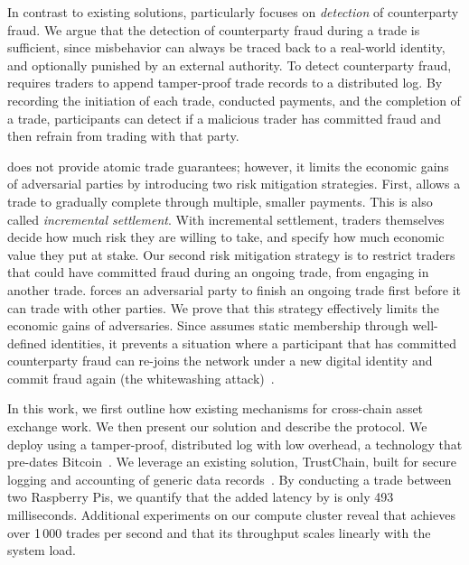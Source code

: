 In contrast to existing solutions, \ModelName{} particularly focuses on \emph{detection} of counterparty fraud.
We argue that the detection of counterparty fraud during a trade is sufficient, since misbehavior can always be traced back to a real-world identity, and optionally punished by an external authority.
To detect counterparty fraud, \ModelName{} requires traders to append tamper-proof trade records to a distributed log.
By recording the initiation of each trade, conducted payments, and the completion of a trade, participants can detect if a malicious trader has committed fraud and then refrain from trading with that party.

\ModelName{} does not provide atomic trade guarantees; however, it limits the economic gains of adversarial parties by introducing two risk mitigation strategies.
First, \ModelName{} allows a trade to gradually complete through multiple, smaller payments.
This is also called \emph{incremental settlement}.
With incremental settlement, traders themselves decide how much risk they are willing to take, and specify how much economic value they put at stake.
Our second risk mitigation strategy is to restrict traders that could have committed fraud during an ongoing trade, from engaging in another trade.
\ModelName{} forces an adversarial party to finish an ongoing trade first before it can trade with other parties.
We prove that this strategy effectively limits the economic gains of adversaries.
Since \ModelName{} assumes static membership through well-defined identities, it prevents a situation where a participant that has committed counterparty fraud can re-joins the network under a new digital identity and commit fraud again (the whitewashing attack)~\cite{feldman2006free}.

In this work, we first outline how existing mechanisms for cross-chain asset exchange work.
We then present our solution and describe the \ModelName{} protocol.
We deploy \ModelName{} using a tamper-proof, distributed log with low overhead, a technology that pre-dates Bitcoin~\cite{haeberlen2007peerreview}.
We leverage an existing solution, TrustChain, built for secure logging and accounting of generic data records~\cite{otte2017trustchain}.
By conducting a trade between two Raspberry Pis, we quantify that the added latency by \ModelName{} is only 493 milliseconds.
Additional experiments on our compute cluster reveal that \ModelName{} achieves over 1\,000 trades per second and that its throughput scales linearly with the system load.

